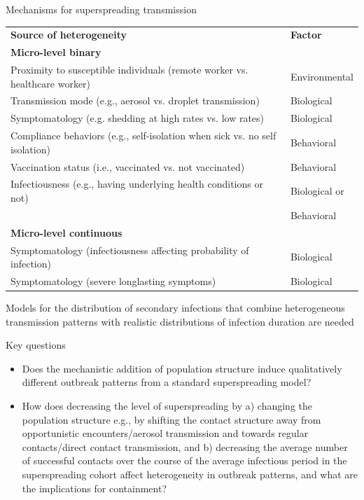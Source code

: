 \documentclass[
  ignorenonframetext,
]{beamer}
\providecommand{\tightlist}{%
  \setlength{\itemsep}{0pt}\setlength{\parskip}{0pt}}
\begin{document}
\begin{frame}{Mechanisms for superspreading transmission}
\protect\hypertarget{mechanisms-for-superspreading-transmission}{}
\begin{table}\scriptsize
\begin{tabular}{ll}
\textbf{Source of heterogeneity} & \textbf{Factor} \\[3pt]
\textbf{Micro-level binary} &  \\[3pt]
Proximity to susceptible individuals (remote worker vs. healthcare worker) 
& Environmental \\
Transmission mode (e.g., aerosol vs. droplet transmission)   &Biological  \\
Symptomatology (e.g. shedding at high rates vs. low rates) &  Biological
\\
Compliance behaviors (e.g., self-isolation when sick vs. no self isolation)   &Behavioral \\
Vaccination status (i.e., vaccinated vs. not vaccinated) & Behavioral\\
Infectiousness (e.g., having underlying health conditions or not) & Biological or \\
& Behavioral \\[3pt]
\textbf{Micro-level continuous} &  \\[3pt]
Symptomatology (infectiousness affecting probability of infection) & Biological \\
 Symptomatology  (severe longlasting symptoms)& Biological \\ 
\end{tabular}
\end{table}

Models for the distribution of secondary infections that combine
heterogeneous transmission patterns with realistic distributions of
infection duration are needed
\end{frame}

\begin{frame}{Key questions}
\protect\hypertarget{key-questions}{}
\begin{itemize}
\tightlist
\item
  Does the mechanistic addition of population structure induce
  qualitatively different outbreak patterns from a standard
  superspreading model?
\item
  How does decreasing the level of superspreading by a) changing the
  population structure e.g., by shifting the contact structure away from
  opportunistic encounters/aerosol transmission and towards regular
  contacts/direct contact transmission, and b) decreasing the average
  number of successful contacts over the course of the average
  infectious period in the superspreading cohort affect heterogeneity in
  outbreak patterns, and what are the implications for containment?
\end{itemize}
\end{frame}
\end{document}
